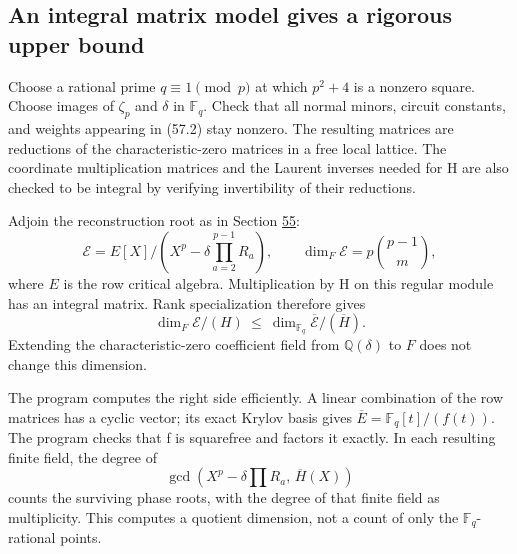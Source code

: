 \documentclass[11pt,reqno]{amsart}
\theoremstyle{plain}
\begin{document}
\subsection{An integral matrix model gives a rigorous upper bound}\label{sec:57.2}

Choose a rational prime \(q\equiv1\pmod p\) at which
\(p^2+4\) is a nonzero square. Choose images of \(\zeta_p\) and
\(\delta\) in \(\mathbb F_q\). Check that all normal minors,
circuit constants, and weights appearing in (57.2) stay nonzero.
The resulting matrices are reductions of the characteristic-zero
matrices in a free local lattice. The coordinate multiplication matrices
and the Laurent inverses needed for H are also checked to be integral
by verifying invertibility of their reductions.

Adjoin the reconstruction root as in Section \hyperref[sec:55]{55}:
\begin{equation*}
 \mathcal E=E[X]/\left(X^p-\delta\prod_{a=2}^{p-1}R_a\right),
 \qquad \dim_F\mathcal E=p\binom{p-1}{m},
 \tag{57.4}
\end{equation*}
where \(E\) is the row critical algebra. Multiplication by H on
this regular module has an integral matrix. Rank specialization therefore
gives
\begin{equation*}
 \dim_F\mathcal E/(H)
 \ \le\ \dim_{\mathbb F_q}\overline{\mathcal E}/(\overline H).
 \tag{57.5}
\end{equation*}
Extending the characteristic-zero coefficient field from
\(\mathbb Q(\delta)\) to \(F\) does not change this dimension.

The program computes the right side efficiently. A linear combination
of the row matrices has a cyclic vector; its exact Krylov basis gives
\(\overline E=\mathbb F_q[t]/(f(t))\). The program checks that f
is squarefree and factors it exactly. In each resulting finite field,
the degree of
\begin{equation*}
 \gcd\left(X^p-\delta\prod R_a,\,\overline H(X)\right)
 \tag{57.6}
\end{equation*}
counts the surviving phase roots, with the degree of that finite field
as multiplicity. This computes a quotient dimension, not a count of
only the \(\mathbb F_q\)-rational points.
\end{document}
